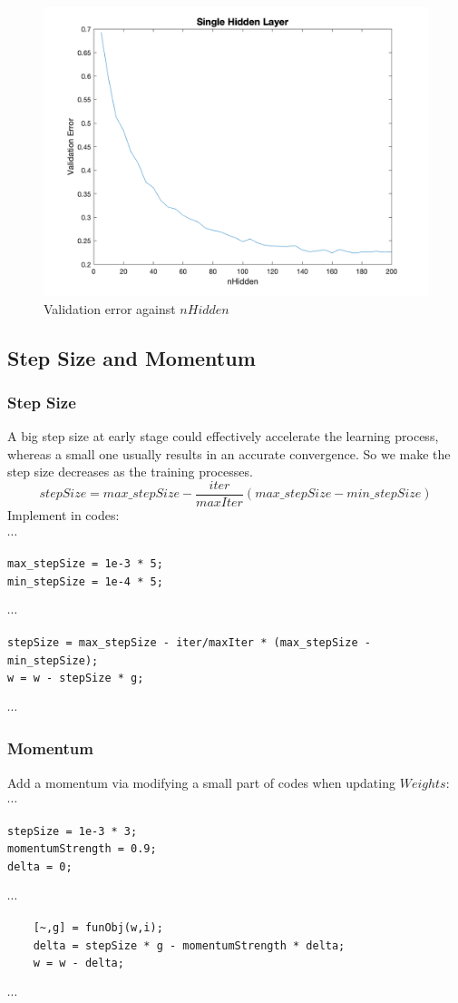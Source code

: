 \documentclass{article}
\begin{document}
\begin{figure}
	\centering
	\includegraphics[scale=0.3]{1.png}
	\caption{Validation error against $nHidden$}
	\label{fig-1}
\end{figure}

\subsection{Step Size and Momentum}
\subsubsection{Step Size}
A big step size at early stage could effectively accelerate the learning process, whereas a small one usually results in an accurate convergence. So we make the step size decreases as the training processes.
\[
stepSize = max\_stepSize - \frac{iter}{maxIter} (max\_stepSize - min\_stepSize)
\]
Implement in codes: \\
$\cdots$
\begin{lstlisting}
max_stepSize = 1e-3 * 5;
min_stepSize = 1e-4 * 5;
\end{lstlisting}
$\cdots$
\begin{lstlisting}
stepSize = max_stepSize - iter/maxIter * (max_stepSize - min_stepSize);
w = w - stepSize * g;
\end{lstlisting}
$\cdots$

\subsubsection{Momentum}
Add a momentum via modifying a small part of codes when updating $Weights$: \\
$\cdots$
\begin{lstlisting}
stepSize = 1e-3 * 3;
momentumStrength = 0.9;
delta = 0;
\end{lstlisting}
$\cdots$
\begin{lstlisting}
    [~,g] = funObj(w,i);
    delta = stepSize * g - momentumStrength * delta;
    w = w - delta;
\end{lstlisting}
$\cdots$
\end{document}
